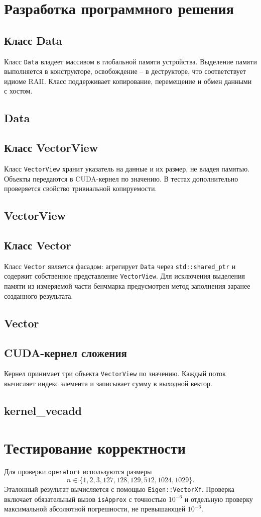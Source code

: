 \documentclass[a4paper,14pt]{article}
\newcommand{\codefile}[2]{%
  \subsection*{#1}%
}
\begin{document}
\section{Разработка программного решения}
\subsection{Класс Data}
Класс \texttt{Data} владеет массивом в глобальной памяти устройства. Выделение памяти выполняется в конструкторе, освобождение -- в деструкторе, что соответствует идиоме RAII. Класс поддерживает копирование, перемещение и обмен данными с хостом.
\codefile{Data}{../core/include/Data.cuh}

\subsection{Класс VectorView}
Класс \texttt{VectorView} хранит указатель на данные и их размер, не владея памятью. Объекты передаются в CUDA-кернел по значению. В тестах дополнительно проверяется свойство тривиальной копируемости.
\codefile{VectorView}{../core/include/VectorView.cuh}

\subsection{Класс Vector}
Класс \texttt{Vector} является фасадом: агрегирует \texttt{Data} через \texttt{std::shared\_ptr} и содержит собственное представление \texttt{VectorView}. Для исключения выделения памяти из измеряемой части бенчмарка предусмотрен метод заполнения заранее созданного результата.
\codefile{Vector}{../core/include/Vector.cuh}

\subsection{CUDA-кернел сложения}
Кернел принимает три объекта \texttt{VectorView} по значению. Каждый поток вычисляет индекс элемента и записывает сумму в выходной вектор.
\codefile{kernel\_vecadd}{../core/include/kernel_vecadd.cuh}

\section{Тестирование корректности}
Для проверки \texttt{operator+} используются размеры
\[
 n \in \{1,2,3,127,128,129,512,1024,1029\}.
\]
Эталонный результат вычисляется с помощью \texttt{Eigen::VectorXf}. Проверка включает обязательный вызов \texttt{isApprox} с точностью $10^{-6}$ и отдельную проверку максимальной абсолютной погрешности, не превышающей $10^{-6}$.
\end{document}
